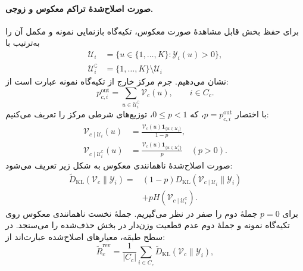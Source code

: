 \paragraph{صورت اصلاح‌شدهٔ تراکم معکوس و زوجی.}
برای حفظ بخش قابل مشاهدهٔ صورت معکوس، تکیه‌گاه
بازنمایی نمونه و مکمل آن را به‌ترتیب با
\begin{equation}\label{cmp:eq:ch3-KL-mask-support}
\begin{aligned}
\mathcal U_i&=\{u\in\{1,\ldots,K\}:\mathscr Y_i(u)>0\},\\
\mathcal U_i^{\complement}&=\{1,\ldots,K\}\setminus\mathcal U_i
\end{aligned}
\end{equation}
نشان می‌دهیم. جرم مرکز خارج از تکیه‌گاه نمونه
عبارت است از:
\begin{equation}\label{cmp:eq:ch3-KL-mask-mass}
p_{c,i}^{\mathrm{out}}=\sum_{u\in\mathcal U_i^{\complement}}
\mathcal V_c(u),\qquad i\in C_c.
\end{equation}
با اختصار $p=p_{c,i}^{\mathrm{out}}$، که $0\le p<1$،
توزیع‌های شرطی مرکز را تعریف می‌کنیم:
\begin{equation}\label{cmp:eq:ch3-KL-mask-conditional}
\begin{aligned}
\mathcal V_{c\mid\mathcal U_i}(u)
&=\frac{\mathcal V_c(u)\mathbf1_{\{u\in\mathcal U_i\}}}{1-p},\\
\mathcal V_{c\mid\mathcal U_i^{\complement}}(u)
&=\frac{\mathcal V_c(u)\mathbf1_{\{u\in\mathcal U_i^{\complement}\}}}{p}
\quad(p>0).
\end{aligned}
\end{equation}
صورت اصلاح‌شدهٔ ناهمانندی معکوس به شکل زیر تعریف
می‌شود:
\begin{equation}\label{cmp:eq:ch3-KL-mask-corrected-dissimilarity}
\boxed{\begin{aligned}
\widetilde D_{\mathrm{KL}}(\mathcal V_c\|\mathscr Y_i)
={}&(1-p)D_{\mathrm{KL}}(\mathcal V_{c\mid\mathcal U_i}\|\mathscr Y_i)\\
&+pH(\mathcal V_{c\mid\mathcal U_i^{\complement}}).
\end{aligned}}
\end{equation}
برای $p=0$ جملهٔ دوم را صفر در نظر می‌گیریم.
جملهٔ نخست ناهمانندی معکوس روی تکیه‌گاه نمونه و
جملهٔ دوم عدم قطعیت وزن‌دار در بخش حذف‌شده را
می‌سنجد. در سطح طبقه، معیارهای اصلاح‌شده عبارت‌اند از:
\begin{equation}\label{cmp:eq:ch3-KL-mask-corrected-reverse}
\widetilde R_c^{\mathrm{rev}}=\frac1{|C_c|}\sum_{i\in C_c}
\widetilde D_{\mathrm{KL}}(\mathcal V_c\|\mathscr Y_i),
\end{equation}
